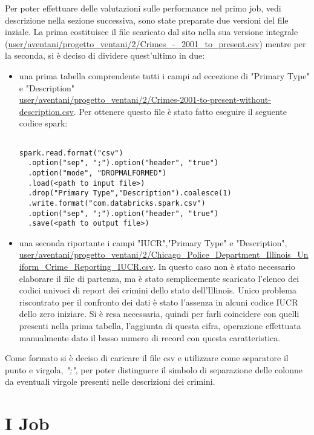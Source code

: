 \documentclass[10pt]{article}
\begin{document}
Per poter effettuare delle valutazioni sulle performance nel primo job, vedi descrizione nella sezione successiva, sono state preparate due versioni del file inziale.
La prima costituisce il file scaricato dal sito nella sua versione integrale (\url{user/aventani/progetto_ventani/2/Crimes_-_2001_to_present.csv}) mentre per la seconda, si è deciso di dividere quest'ultimo in due:
\begin{itemize}
\item una prima tabella comprendente tutti i campi ad eccezione di "Primary Type" e "Description" \\ \url{user/aventani/progetto_ventani/2/Crimes-2001-to-present-without-description.csv}. Per ottenere questo file è stato fatto eseguire il seguente codice spark:
\begin{lstlisting}

spark.read.format("csv")
  .option("sep", ";").option("header", "true")
  .option("mode", "DROPMALFORMED")
  .load(<path to input file>)
  .drop("Primary Type","Description").coalesce(1)
  .write.format("com.databricks.spark.csv")
  .option("sep", ";").option("header", "true")
  .save(<path to output file>)

\end{lstlisting}

\item una seconda riportante i campi "IUCR","Primary Type" e "Description", \\ \url{user/aventani/progetto_ventani/2/Chicago_Police_Department_Illinois_Uniform_Crime_Reporting_IUCR.csv}. In questo caso non è stato necessario elaborare il file di partenza, ma è stato semplicemente scaricato l'elenco dei codici univoci di report dei crimini dello stato dell'Illinois. Unico problema riscontrato per il confronto dei dati è stato l'assenza in alcuni codice IUCR dello zero iniziare. Si è resa necessaria, quindi per farli coincidere con quelli presenti nella prima tabella, l'aggiunta di questa cifra, operazione effettuata manualmente dato il basso numero di record con questa caratteristica. 
\end{itemize}

Come formato si è deciso di caricare il file csv e utilizzare come separatore il punto e virgola, \textit{";"}, per poter distinguere il simbolo di separazione delle colonne da eventuali virgole presenti nelle descrizioni dei crimini.

\section{I Job}
\end{document}

